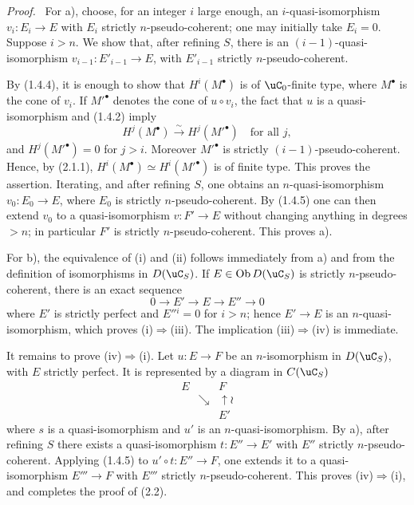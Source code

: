 \documentclass[11pt]{article}
\theoremstyle{plain}
\theoremstyle{definition}
\theoremstyle{remark}
\newenvironment{prooftext}{\par\noindent\textit{Proof.}\ }{\par\medskip}
\DeclareMathOperator{\ob}{Ob}
\providecommand{\iso}{\xrightarrow{\sim}}
\begin{document}
\begin{prooftext}
For a), choose, for an integer $i$ large enough, an $i$-quasi-isomorphism $v_i:E_i\to E$ with $E_i$ strictly $n$-pseudo-coherent; one may initially take $E_i=0$. Suppose $i>n$. We show that, after refining $S$, there is an $(i-1)$-quasi-isomorphism $v_{i-1}:E'_{i-1}\to E$, with $E'_{i-1}$ strictly $n$-pseudo-coherent.

By (1.4.4), it is enough to show that $H^i(M^\bullet)$ is of $\uC_0$-finite type, where $M^\bullet$ is the cone of $v_i$. If $M'^\bullet$ denotes the cone of $u\circ v_i$, the fact that $u$ is a quasi-isomorphism and (1.4.2) imply
\[
H^j(M^\bullet)\iso H^j(M'^\bullet)\quad\text{for all }j,
\]
and $H^j(M'^\bullet)=0$ for $j>i$. Moreover $M'^\bullet$ is strictly $(i-1)$-pseudo-coherent. Hence, by (2.1.1), $H^i(M^\bullet)\simeq H^i(M'^\bullet)$ is of finite type. This proves the assertion. Iterating, and after refining $S$, one obtains an $n$-quasi-isomorphism $v_0:E_0\to E$, where $E_0$ is strictly $n$-pseudo-coherent. By (1.4.5) one can then extend $v_0$ to a quasi-isomorphism $v:F'\to E$ without changing anything in degrees $>n$; in particular $F'$ is strictly $n$-pseudo-coherent. This proves a).

For b), the equivalence of (i) and (ii) follows immediately from a) and from the definition of isomorphisms in $D(\uC_S)$. If $E\in\ob D(\uC_S)$ is strictly $n$-pseudo-coherent, there is an exact sequence
\[
0\longrightarrow E'\longrightarrow E\longrightarrow E''\longrightarrow0
\]
where $E'$ is strictly perfect and $E''{}^i=0$ for $i>n$; hence $E'\to E$ is an $n$-quasi-isomorphism, which proves (i)$\Rightarrow$(iii). The implication (iii)$\Rightarrow$(iv) is immediate.

It remains to prove (iv)$\Rightarrow$(i). Let $u:E\to F$ be an $n$-isomorphism in $D(\uC_S)$, with $E$ strictly perfect. It is represented by a diagram in $C(\uC_S)$
\[
\begin{array}{ccc}
E && F\\
& \searrow & \uparrow\wr\\
&& E'
\end{array}
\]
where $s$ is a quasi-isomorphism and $u'$ is an $n$-quasi-isomorphism. By a), after refining $S$ there exists a quasi-isomorphism $t:E''\to E'$ with $E''$ strictly $n$-pseudo-coherent. Applying (1.4.5) to $u'\circ t:E''\to F$, one extends it to a quasi-isomorphism $E'''\to F$ with $E'''$ strictly $n$-pseudo-coherent. This proves (iv)$\Rightarrow$(i), and completes the proof of (2.2).
\end{prooftext}
\end{document}
